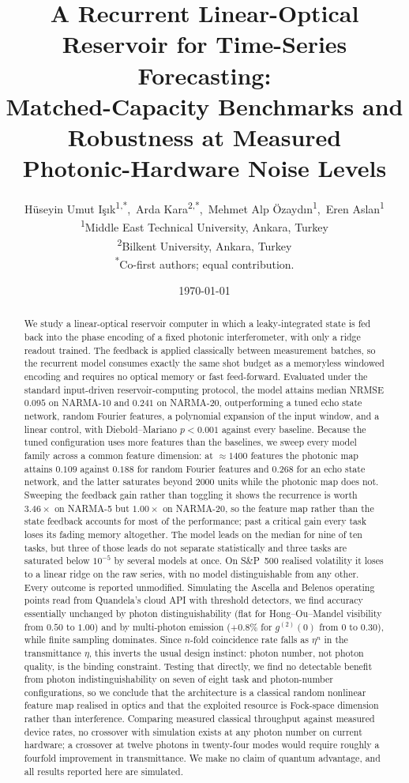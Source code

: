 \documentclass[11pt]{article}
\title{A Recurrent Linear-Optical Reservoir for Time-Series Forecasting:\\
       Matched-Capacity Benchmarks and Robustness at Measured\\
       Photonic-Hardware Noise Levels}
\author{%
  H\"useyin Umut I\c{s}\i{}k\textsuperscript{1,*},\,
  Arda Kara\textsuperscript{2,*},\,
  Mehmet Alp \"Ozayd\i{}n\textsuperscript{1},\,
  Eren Aslan\textsuperscript{1}
  \\[0.6em]
  \normalsize \textsuperscript{1}Middle East Technical University, Ankara, Turkey \\
  \normalsize \textsuperscript{2}Bilkent University, Ankara, Turkey \\
  \normalsize \textsuperscript{*}Co-first authors; equal contribution.
}
\date{\today}
\begin{document}
\maketitle

\begin{abstract}
We study a linear-optical reservoir computer in which a leaky-integrated state is fed back
into the phase encoding of a fixed photonic interferometer, with only a ridge readout
trained. The feedback is applied classically between measurement batches, so the recurrent
model consumes exactly the same shot budget as a memoryless windowed encoding and requires
no optical memory or fast feed-forward. Evaluated under the standard input-driven
reservoir-computing protocol, the model attains median NRMSE $0.095$ on NARMA-10 and
$0.241$ on NARMA-20, outperforming a tuned echo state network, random Fourier
features, a polynomial expansion of the input window, and a linear control, with
Diebold--Mariano $p < 0.001$ against every baseline. Because the tuned configuration uses
more features than the baselines, we sweep every model family across a common feature
dimension: at $\approx 1400$ features the photonic map attains $0.109$ against $0.188$ for
random Fourier features and $0.268$ for an echo state network, and the latter saturates
beyond $2000$ units while the photonic map does not. Sweeping the feedback gain rather than
toggling it shows the recurrence is worth $3.46\times$ on NARMA-5 but $1.00\times$ on
NARMA-20, so the feature map rather than the state feedback accounts for most of the
performance; past a critical gain every task loses its fading memory altogether. The model
leads on the median for nine of ten tasks, but three of those leads do not separate
statistically and three tasks are saturated below $10^{-5}$ by several models at once. On
S\&P~500 realised volatility it loses to a linear ridge on the raw series, with no model
distinguishable from any other. Every outcome is reported unmodified.
Simulating the Ascella and Belenos operating points read from Quandela's cloud API with
threshold detectors, we find accuracy essentially unchanged by photon distinguishability
(flat for Hong--Ou--Mandel visibility from $0.50$ to $1.00$) and by multi-photon emission
($+0.8\%$ for $g^{(2)}(0)$ from $0$ to $0.30$), while finite sampling dominates. Since
$n$-fold coincidence rate falls as $\eta^{n}$ in the transmittance $\eta$, this inverts the
usual design instinct: photon number, not photon quality, is the binding constraint. Testing
that directly, we find no detectable benefit from photon indistinguishability on seven of eight
task and photon-number configurations, so we conclude that the architecture is a classical
random nonlinear feature map realised in optics and that the exploited resource is Fock-space
dimension rather than interference. Comparing measured classical throughput against measured
device rates, no crossover with simulation exists at any photon number on current hardware; a
crossover at twelve photons in twenty-four modes would require roughly a fourfold improvement
in transmittance. We make no claim of quantum advantage, and all results reported here are
simulated.
\end{abstract}
\end{document}
